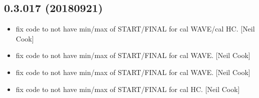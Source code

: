\documentclass[a4paper,10pt,english]{report}
\begin{document}
\subsection{0.3.017 (2018\sphinxhyphen{}09\sphinxhyphen{}21)}
\label{\detokenize{misc/changelog:id333}}\begin{itemize}
\item {} 
 \sphinxhyphen{} fix code to not have min/max of 
START/FINAL for cal WAVE/cal HC. {[}Neil Cook{]}

\item {} 
 \sphinxhyphen{} fix code to not have min/max of 
START/FINAL for cal WAVE. {[}Neil Cook{]}

\item {} 
 \sphinxhyphen{} fix code to not have min/max of
 START/FINAL for cal WAVE. {[}Neil Cook{]}

\item {} 
 \sphinxhyphen{} fix code to not have min/max of 
START/FINAL for cal HC. {[}Neil Cook{]}

\end{itemize}
\end{document}
